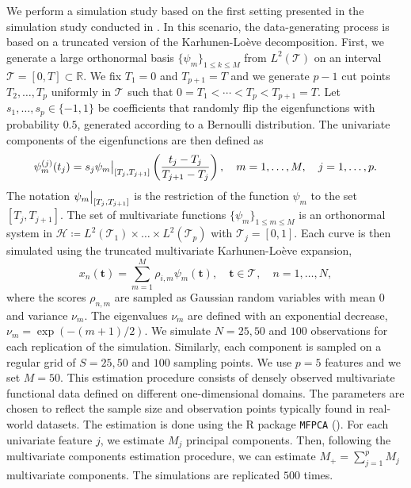 \documentclass{article}
\newcounter{th}
\newcounter{scenario}[section]
\newcommand{\RR}{\mathbb{R}} %
\newcommand{\TT}[1]{\mathcal{T}_{#1}} %
\newcommand{\HH}{\mathcal{H}} %
\newcommand{\pointt}{\mathbf{t}} %
\newcommand\restr[2]{{ %
  \left.\kern-\nulldelimiterspace  %
  #1  %
  \vphantom{\big|}  %
  \right|_{#2}  %
}}
\begin{document}
We perform a simulation study based on the first setting presented in the simulation study conducted in \cite{happMultivariateFunctionalPrincipal2018}. In this scenario, the data-generating process is based on a truncated version of the Karhunen-Loève decomposition. First, we generate a large orthonormal basis $\{\psi_m\}_{1 \leq k \leq M}$ from $L^{2}(\mathcal{T})$ on an interval $\mathcal{T} = [0, T] \subset \RR$. We fix $T_1 = 0$ and $T_{p + 1} = T$ and we generate $p - 1$ cut points $T_2, \dots, T_p$ uniformly in $\TT{}$ such that $0 = T_1 < \cdots < T_p < T_{p+1} = T$. Let $s_1, \dots, s_p \in \{-1, 1\}$ be coefficients that randomly flip the eigenfunctions with probability $0.5$, generated according to a Bernoulli distribution. The univariate components of the eigenfunctions are then defined as
\begin{equation}\label{eq:simulation_uni_component}
    \psi_m^{(j)}(t_j) = s_j \restr{\psi_m}{[T_j, T_{j + 1}]}\left(\frac{t_j - T_j}{T_{j + 1} - T_j}\right), \quad m = 1, \dots, M, \quad j = 1, \dots, p.
\end{equation}
The notation $\restr{\psi_m}{[T_j, T_{j + 1}]}$ is the restriction of the function $\psi_m$ to the set $[T_j, T_{j + 1}]$. The set of multivariate functions $\{\psi_m\}_{1 \leq m \leq M}$ is an orthonormal system in $\HH \coloneqq L^2({\mathcal{T}_{1}}) \times \dots \times L^2({\mathcal{T}_{p}})$ with $\mathcal{T}_{j} = [0, 1]$. Each curve is then simulated using the truncated multivariate Karhunen-Loève expansion,
\begin{equation}
    x_n(\pointt) = \sum_{m = 1}^M \rho_{i, m} \psi_m(\pointt), \quad \pointt \in \TT{},\quad n = 1, \dots, N,
\end{equation}
where the scores $\rho_{n, m}$ are sampled as Gaussian random variables with mean $0$ and variance $\nu_m$. The eigenvalues $\nu_m$ are defined with an exponential decrease, $\nu_m = \exp(-(m + 1)/2)$. We simulate $N = 25, 50$ and $100$ observations for each replication of the simulation. Similarly, each component is sampled on a regular grid of $S = 25, 50$ and $100$ sampling points. We use $p = 5$ features and we set $M = 50$. This estimation procedure consists of densely observed multivariate functional data defined on different one-dimensional domains. The parameters are chosen to reflect the sample size and observation points typically found in real-world datasets. The estimation is done using the \textsf{R} package \texttt{MFPCA} (\cite{happ-kurzObjectOrientedSoftwareFunctional2020}). For each univariate feature $j$, we estimate $M_j$ principal components. Then, following the multivariate components estimation procedure, we can estimate $M_+ = \sum_{j = 1}^p M_j$ multivariate components. The simulations are replicated $500$ times.
\end{document}
